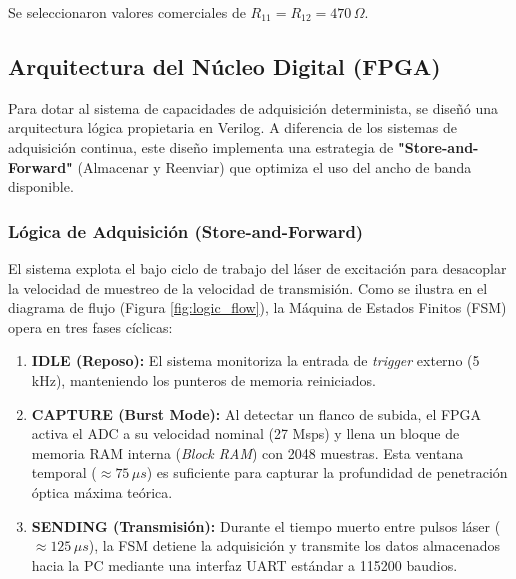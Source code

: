 \documentclass[12pt,letterpaper]{article}
\begin{document}
Se seleccionaron valores comerciales de $R_{11} = R_{12} = 470\,\Omega$.

\subsection{Arquitectura del Núcleo Digital (FPGA)}

Para dotar al sistema de capacidades de adquisición determinista, se diseñó una arquitectura lógica propietaria en Verilog. A diferencia de los sistemas de adquisición continua, este diseño implementa una estrategia de \textbf{"Store-and-Forward"} (Almacenar y Reenviar) que optimiza el uso del ancho de banda disponible.

\subsubsection{Lógica de Adquisición (Store-and-Forward)}
El sistema explota el bajo ciclo de trabajo del láser de excitación para desacoplar la velocidad de muestreo de la velocidad de transmisión. Como se ilustra en el diagrama de flujo (Figura \ref{fig:logic_flow}), la Máquina de Estados Finitos (FSM) opera en tres fases cíclicas:

\begin{enumerate}
    \item \textbf{IDLE (Reposo):} El sistema monitoriza la entrada de \textit{trigger} externo (5 kHz), manteniendo los punteros de memoria reiniciados.
    \item \textbf{CAPTURE (Burst Mode):} Al detectar un flanco de subida, el FPGA activa el ADC a su velocidad nominal (27 Msps) y llena un bloque de memoria RAM interna (\textit{Block RAM}) con 2048 muestras. Esta ventana temporal ($\approx 75\,\mu s$) es suficiente para capturar la profundidad de penetración óptica máxima teórica.
    \item \textbf{SENDING (Transmisión):} Durante el tiempo muerto entre pulsos láser ($\approx 125\,\mu s$), la FSM detiene la adquisición y transmite los datos almacenados hacia la PC mediante una interfaz UART estándar a 115200 baudios.
\end{enumerate}
\end{document}
